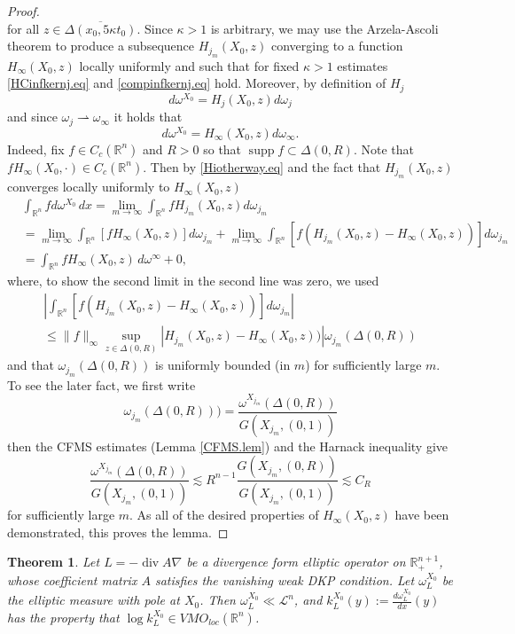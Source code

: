 \documentclass[11pt, a4paper,leqno]{amsart}
\theoremstyle{plain}
\newtheorem{theorem}[equation]{Theorem}
\theoremstyle{definition}
\theoremstyle{remark}
\numberwithin{equation}{section}
\newcommand{\rn}{\mathbb{R}^n}
\newcommand{\ree}{\mathbb{R}^{n+1}}
\newcommand{\hm}{\omega}
\DeclareMathOperator{\supp}{supp}
\def\div{\mathop{\operatorname{div}}\nolimits}
\begin{document}
\begin{proof}
\begin{equation}
\end{equation}
for all $z \in \overline{\Delta(x_0, 5\kappa t_0)}$. Since $\kappa > 1$ is arbitrary, we may use the Arzela-Ascoli theorem to produce a subsequence  $H_{j_m}(X_0, z)$ converging to a function $H_\infty(X_0,z)$ locally uniformly and such that for fixed $\kappa > 1$ estimates \eqref{HCinfkernj.eq} and \eqref{compinfkernj.eq} hold. Moreover, by definition of $H_j$
\begin{equation}\label{Hiotherway.eq}
d \hm^{X_0} = H_j(X_0,z) d\hm_j
\end{equation}
and since $\hm_j \rightharpoonup \hm_\infty$ it holds that 
\[d \hm^{X_0} = H_\infty(X_0,z) d\hm_\infty.\]
Indeed, fix $f \in C_c(\rn)$ and $R > 0$ so that $\supp f \subset \Delta(0,R)$. Note that $fH_\infty(X_0,\cdot) \in C_c(\rn)$. Then by \eqref{Hiotherway.eq} and the fact that $H_{j_m}(X_0, z)$ converges locally uniformly to $H_\infty(X_0,z)$
\begin{align*}
&\int_{\rn} f d\hm^{X_0} \, dx = \lim_{m \to \infty} \int_{\rn} f H_{j_m}(X_0,z) d\hm_{j_m}
\\& = \lim_{m \to \infty} \int_{\rn} [f H_\infty(X_0,z)] d\hm_{j_m} + \lim_{m \to \infty} \int_{\rn} [f (H_{j_m}(X_0,z) - H_\infty(X_0,z))] d\hm_{j_m}
\\ & = \int_{\rn} f H_\infty(X_0,z) \, d\hm^\infty + 0,
\end{align*}
where, to show the second limit in the second line was zero, we used 
\begin{multline*}
\left| \int_{\rn} [f (H_{j_m}(X_0,z) - H_\infty(X_0,z))] d\hm_{j_m} \right|
\\  \le \|f\|_\infty \sup_{z \in \Delta(0,R)}|H_{j_m}(X_0,z) - H_\infty(X_0,z))| \hm_{j_m}(\Delta(0,R))
\end{multline*}
and that $\hm_{j_m}(\Delta(0,R))$ is uniformly bounded  (in $m$) for sufficiently large $m$. To see the later fact, we first write
\[\hm_{j_m}(\Delta(0,R))) = \frac{\hm^{X_{j_m}}(\Delta(0,R))}{G(X_{j_m}, (0,1))}\]
then the CFMS estimates (Lemma \ref{CFMS.lem}) and the Harnack inequality give
\[\frac{\hm^{X_{j_m}}(\Delta(0,R))}{G(X_{j_m}, (0,1))} \lesssim R^{n-1} \frac{G(X_{j_m}, (0,R))}{G(X_{j_m}, (0,1))} \lesssim C_R\]
for sufficiently large $m$.
As all of the desired properties of $H_\infty(X_0,z)$ have been demonstrated, this proves the lemma.
\end{proof}

\begin{theorem}\label{mainvmopt2.thrm}
Let $L = -\div A\nabla$ be a divergence form elliptic operator on $\ree_+$, whose coefficient matrix $A$ satisfies the vanishing weak DKP condition. Let $\hm^{X_0}_L$ be the elliptic measure with pole at ${X_0}$. Then $\hm^{X_0}_L \ll \mathcal{L}^n$, and $k^{X_0}_L(y) := \tfrac{d\hm^{X_0}_L}{dx}(y)$ has the property that $\log k^{X_0}_L \in VMO_{loc}(\rn)$. 
\end{theorem}
\end{document}

